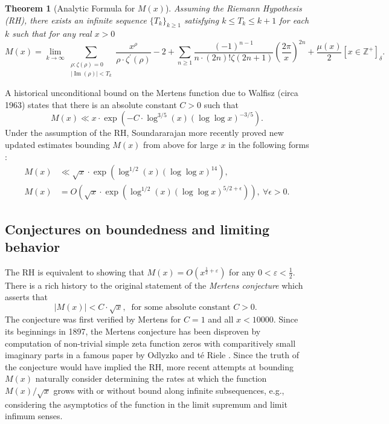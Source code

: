 \documentclass[11pt,reqno,a4letter]{article}
\numberwithin{figure}{section}
\numberwithin{table}{section}
\newcommand{\Iverson}[1]{\ensuremath{\left[#1\right]_{\delta}}}
\theoremstyle{plain}
\newtheorem{theorem}{Theorem}
\numberwithin{theorem}{section}
\theoremstyle{definition}
\renewcommand{\Im}{\operatorname{Im}}
\begin{document}
\begin{theorem}[Analytic Formula for $M(x)$] 
\label{theorem_MxMellinTransformInvFormula} 
Assuming the Riemann Hypothesis (RH), there exists an infinite sequence 
$\{T_k\}_{k \geq 1}$ satisfying $k \leq T_k \leq k+1$ for each $k$ 
such that for any real $x > 0$ 
\[
M(x) = \lim_{k \rightarrow \infty} 
     \sum_{\substack{\rho: \zeta(\rho) = 0 \\ |\Im(\rho)| < T_k}} 
     \frac{x^{\rho}}{\rho \cdot \zeta^{\prime}(\rho)} - 2 + 
     \sum_{n \geq 1} \frac{(-1)^{n-1}}{n \cdot (2n)! \zeta(2n+1)} 
     \left(\frac{2\pi}{x}\right)^{2n} + 
     \frac{\mu(x)}{2} \Iverson{x \in \mathbb{Z}^{+}}. 
\] 
\end{theorem} 

A historical unconditional bound on the Mertens function due to Walfisz (circa 1963) 
states that there is an absolute constant $C > 0$ such that 
$$M(x) \ll x \cdot \exp\left(-C \cdot \log^{3/5}(x) 
  (\log\log x)^{-3/5}\right).$$ 
Under the assumption of the RH, Soundararajan more recently proved new updated estimates 
bounding $M(x)$ from above for large $x$ in the following forms \cite{SOUND-MERTENS-ANNALS}: 
\begin{align*} 
M(x) & \ll \sqrt{x} \cdot \exp\left(\log^{1/2}(x) (\log\log x)^{14}\right), \\ 
M(x) & = O\left(\sqrt{x} \cdot \exp\left( 
     \log^{1/2}(x) (\log\log x)^{5/2+\epsilon}\right)\right),\ 
     \forall \epsilon > 0. 
\end{align*} 

\subsection{Conjectures on boundedness and limiting behavior} 

The RH is equivalent to showing that 
$M(x) = O\left(x^{\frac{1}{2}+\varepsilon}\right)$ for any 
$0 < \varepsilon < \frac{1}{2}$. 
There is a rich history to the original statement of the \emph{Mertens conjecture} which 
asserts that 
\[ 
|M(x)| < C \cdot \sqrt{x},\ \text{ for some absolute constant $C > 0$. }
\] 
The conjecture was first verified by Mertens for $C = 1$ and all $x < 10000$. 
Since its beginnings in 1897, the Mertens conjecture has been disproven by computation 
of non-trivial simple zeta function zeros with comparitively small imaginary parts in a famous paper by 
Odlyzko and t\'{e} Riele \cite{ODLYZ-TRIELE}. 
Since the truth of the conjecture would have implied the RH, more recent attempts 
at bounding $M(x)$ naturally consider determining the rates at which the function 
$M(x) / \sqrt{x}$ grows with or without bound along infinite 
subsequences, e.g., considering the asymptotics of the function in the limit supremum and 
limit infimum senses. 
\end{document}
